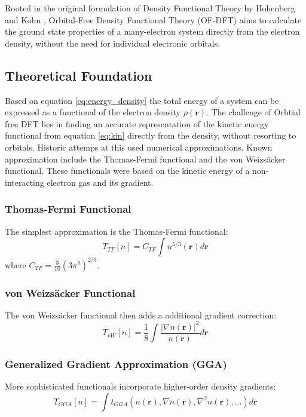 Rooted in the original formulation of Density Functional Theory by Hohenberg and Kohn \cite{hohenberg1964inhomogeneous}, Orbital-Free Density Functional Theory (OF-DFT) aims to calculate the ground state properties of a many-electron system directly from the electron density, without the need for individual electronic orbitals.
\subsection{Theoretical Foundation}

Based on equation \eqref{eq:energy_density} the total energy of a system can be expressed as a functional of the electron density $\rho(\mathbf{r})$. The challenge of Orbtial free DFT lies in finding an accurate representation of the kinetic energy functional from equation \eqref{eq:kin} directly from the density, without resorting to orbitals. Historic attemps\cite{thakkar1992comparison,wang1999orbital} at this used numerical approximations. Known approximation include the Thomas-Fermi functional\cite{thomas_fermi_1927} and the von Weizsäcker functional\cite{von_weizsacker_1935}. These functionals were based on the kinetic energy of a non-interacting electron gas and its gradient.
\subsubsection{Thomas-Fermi Functional}
The simplest approximation is the Thomas-Fermi functional:
\begin{equation}
T_{TF}[n] = C_{TF} \int n^{5/3}(\mathbf{r}) d\mathbf{r}
\end{equation}
where $C_{TF} = \frac{3}{10}(3\pi^2)^{2/3}$.
\subsubsection{von Weizsäcker Functional}
The von Weizsäcker functional then adds a additional gradient correction:
\begin{equation}
T_{vW}[n] = \frac{1}{8} \int \frac{|\nabla n(\mathbf{r})|^2}{n(\mathbf{r})} d\mathbf{r}
\end{equation}
\subsubsection{Generalized Gradient Approximation (GGA)}
More sophisticated functionals incorporate higher-order density gradients:
\begin{equation}
T_{GGA}[n] = \int t_{GGA}(n(\mathbf{r}), \nabla n(\mathbf{r}), \nabla^2 n(\mathbf{r}), ...) d\mathbf{r}
\end{equation}

